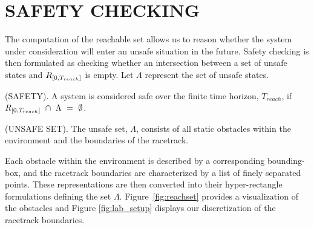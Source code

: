 \documentclass[manuscript,screen,review]{acmart}
\newcommand{\diego}[1]{\textcolor{purple}{\textbf{\underline{DM:}} #1}}
\begin{document}

\section{SAFETY CHECKING}
The computation of the reachable set allows us to reason whether the system under consideration will enter an unsafe situation in the future. Safety checking is then formulated as checking whether an intersection between a set of unsafe states and $\mathnormal{R}_{[0,T_{reach}]}$ is empty. Let $\Lambda$ represent the set of unsafe states.\smallskip

\begin{definition}%
(SAFETY). A system is considered safe over the finite time horizon, $T_{reach}$, if  $\mathnormal{R}_{[0,T_{reach}]} \  \cap \ \Lambda \ = \ \emptyset$.
\end{definition}%
%

\begin{definition}%
(UNSAFE SET). The unsafe set,  $\Lambda$, consists of all static obstacles within the environment and the boundaries of the racetrack. 
\end{definition}%

Each obstacle within the environment is described by a corresponding bounding-box, and the racetrack boundaries are characterized by a list of finely separated points. These representations are then converted into their hyper-rectangle formulations defining the set  $\Lambda$. Figure~\ref{fig:reachset} provides a visualization of the obstacles and Figure \ref{fig:lab_setup} displays our discretization of the racetrack boundaries.

\end{document}
